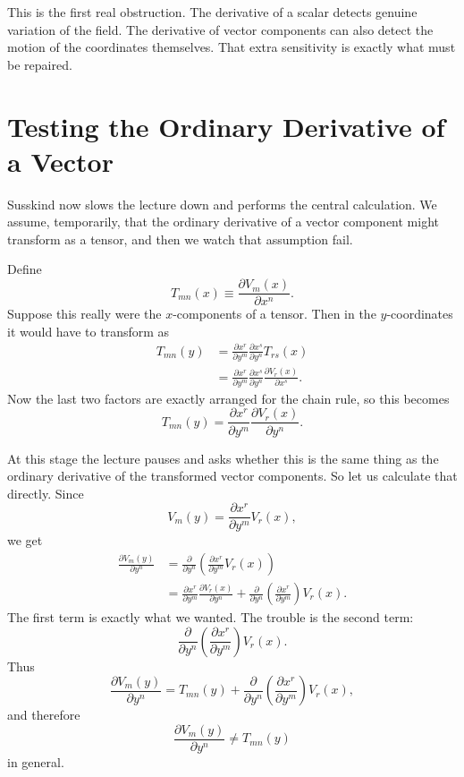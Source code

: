 This is the first real obstruction. The derivative of a scalar detects genuine variation of the field. The derivative of vector components can also detect the motion of the coordinates themselves. That extra sensitivity is exactly what must be repaired.

\section{Testing the Ordinary Derivative of a Vector}

Susskind now slows the lecture down and performs the central calculation. We assume, temporarily, that the ordinary derivative of a vector component might transform as a tensor, and then we watch that assumption fail.

Define
\begin{equation}
T_{mn}(x)\equiv \frac{\partial V_m(x)}{\partial x^n}.
\end{equation}
Suppose this really were the \(x\)-components of a tensor. Then in the \(y\)-coordinates it would have to transform as
\begin{align}
T_{mn}(y)
&=
\frac{\partial x^r}{\partial y^m}
\frac{\partial x^s}{\partial y^n}
T_{rs}(x) \\
&=
\frac{\partial x^r}{\partial y^m}
\frac{\partial x^s}{\partial y^n}
\frac{\partial V_r(x)}{\partial x^s}.
\end{align}
Now the last two factors are exactly arranged for the chain rule, so this becomes
\begin{equation}
T_{mn}(y)
=
\frac{\partial x^r}{\partial y^m}
\frac{\partial V_r(x)}{\partial y^n}.
\end{equation}

At this stage the lecture pauses and asks whether this is the same thing as the ordinary derivative of the transformed vector components. So let us calculate that directly. Since
\begin{equation}
V_m(y)=\frac{\partial x^r}{\partial y^m}V_r(x),
\end{equation}
we get
\begin{align}
\frac{\partial V_m(y)}{\partial y^n}
&=
\frac{\partial}{\partial y^n}
\left(
\frac{\partial x^r}{\partial y^m}V_r(x)
\right) \\
&=
\frac{\partial x^r}{\partial y^m}\frac{\partial V_r(x)}{\partial y^n}
+
\frac{\partial}{\partial y^n}
\left(
\frac{\partial x^r}{\partial y^m}
\right)V_r(x).
\end{align}
The first term is exactly what we wanted. The trouble is the second term:
\begin{equation}
\frac{\partial}{\partial y^n}
\left(
\frac{\partial x^r}{\partial y^m}
\right)V_r(x).
\end{equation}
Thus
\begin{equation}
\frac{\partial V_m(y)}{\partial y^n}
=
T_{mn}(y)
+
\frac{\partial}{\partial y^n}
\left(
\frac{\partial x^r}{\partial y^m}
\right)V_r(x),
\end{equation}
and therefore
\begin{equation}
\frac{\partial V_m(y)}{\partial y^n}\neq T_{mn}(y)
\end{equation}
in general.

